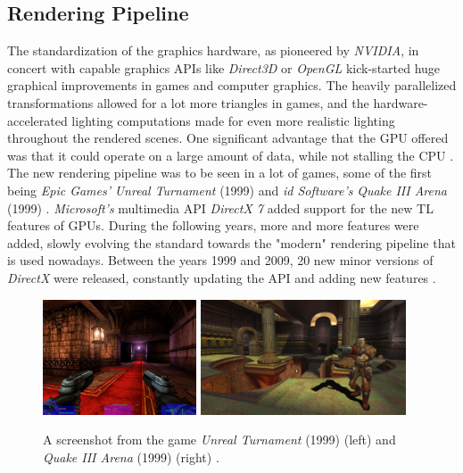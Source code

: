 \subsection*{Rendering Pipeline} \label{subsec-rendering-pipeline}

The standardization of the graphics hardware, as pioneered by \emph{NVIDIA}, in concert with capable 
graphics \ac{API}s like \emph{Direct3D} or \emph{OpenGL} kick-started huge graphical improvements in 
games and computer graphics. The heavily parallelized transformations allowed for a lot more triangles 
in games, and the hardware-accelerated lighting computations made for even more realistic lighting 
throughout the rendered scenes. One significant advantage that the \ac{GPU} offered was that it could 
operate on a large amount of data, while not stalling the \ac{CPU} \cite{Fenno2024}.\\

\noindent
The new rendering pipeline was to be seen in a lot of games, some of the first being \emph{Epic Games'} 
\emph{Unreal Turnament} (1999) and \emph{id Software's} \emph{Quake III Arena} (1999) \cite{UnrealTurnament, 
Quake3Arena}. \emph{Microsoft's} multimedia \ac{API} \emph{DirectX 7} added support for the new \ac{TL} 
features of \ac{GPU}s. During the following years, more and more features were added, slowly evolving the 
standard towards the "modern" rendering pipeline that is used nowadays. Between the years 1999 and 2009,
20 new minor versions of \emph{DirectX} were released, constantly updating the \ac{API} and adding new 
features \cite{WikiDirectX}.

\begin{figure}[h]
    \centering
    \includegraphics[width=172.5px]{images/graphics/unreal-turnament.jpg}
    \includegraphics[width=230px]{images/graphics/quake-iii-arena.jpg}
    \caption{A screenshot from the game \emph{Unreal Turnament} (1999) (left) and \emph{Quake III Arena} (1999) 
    (right) \cite{GamespotUnrealTurnament, GameWatcher2006}.}
    \label{fig:unreal-turnament-quake-arena}
\end{figure}


